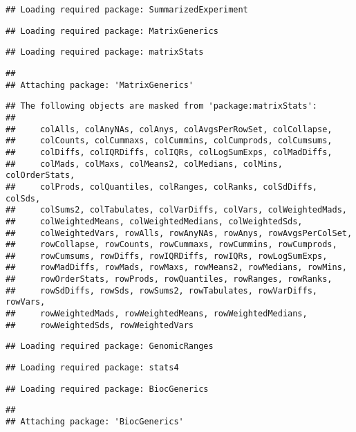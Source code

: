 \documentclass[
  oneside]{book}
\begin{document}
\begin{verbatim}
## Loading required package: SummarizedExperiment
\end{verbatim}

\begin{verbatim}
## Loading required package: MatrixGenerics
\end{verbatim}

\begin{verbatim}
## Loading required package: matrixStats
\end{verbatim}

\begin{verbatim}
## 
## Attaching package: 'MatrixGenerics'
\end{verbatim}

\begin{verbatim}
## The following objects are masked from 'package:matrixStats':
## 
##     colAlls, colAnyNAs, colAnys, colAvgsPerRowSet, colCollapse,
##     colCounts, colCummaxs, colCummins, colCumprods, colCumsums,
##     colDiffs, colIQRDiffs, colIQRs, colLogSumExps, colMadDiffs,
##     colMads, colMaxs, colMeans2, colMedians, colMins, colOrderStats,
##     colProds, colQuantiles, colRanges, colRanks, colSdDiffs, colSds,
##     colSums2, colTabulates, colVarDiffs, colVars, colWeightedMads,
##     colWeightedMeans, colWeightedMedians, colWeightedSds,
##     colWeightedVars, rowAlls, rowAnyNAs, rowAnys, rowAvgsPerColSet,
##     rowCollapse, rowCounts, rowCummaxs, rowCummins, rowCumprods,
##     rowCumsums, rowDiffs, rowIQRDiffs, rowIQRs, rowLogSumExps,
##     rowMadDiffs, rowMads, rowMaxs, rowMeans2, rowMedians, rowMins,
##     rowOrderStats, rowProds, rowQuantiles, rowRanges, rowRanks,
##     rowSdDiffs, rowSds, rowSums2, rowTabulates, rowVarDiffs, rowVars,
##     rowWeightedMads, rowWeightedMeans, rowWeightedMedians,
##     rowWeightedSds, rowWeightedVars
\end{verbatim}

\begin{verbatim}
## Loading required package: GenomicRanges
\end{verbatim}

\begin{verbatim}
## Loading required package: stats4
\end{verbatim}

\begin{verbatim}
## Loading required package: BiocGenerics
\end{verbatim}

\begin{verbatim}
## 
## Attaching package: 'BiocGenerics'
\end{verbatim}
\end{document}
